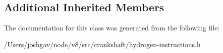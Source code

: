 \subsection*{Additional Inherited Members}


The documentation for this class was generated from the following file\+:\begin{DoxyCompactItemize}
\item 
/\+Users/joshgav/node/v8/src/crankshaft/hydrogen-\/instructions.\+h\end{DoxyCompactItemize}
